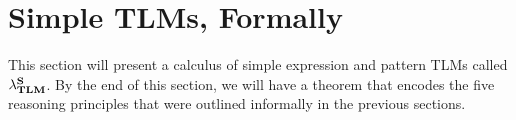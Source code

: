 \documentclass[acmsmall,review,anonymous]{acmart}\settopmatter{printfolios=true,printccs=false,printacmref=false}
\begin{document}
\begin{comment}
\end{comment}

\newcommand{\seTLMsFormallySec}{Simple TLMs, Formally}
\section{\protect\seTLMsFormallySec}
\label{sec:setsms-formally}

This section will present a calculus of simple expression and pattern TLMs called $\mathsf{\lambda}_\textbf{TLM}^\textbf{S}$. By the end of this section, we will have a theorem that encodes the five reasoning principles that were outlined informally in the previous sections. 
\end{document}
